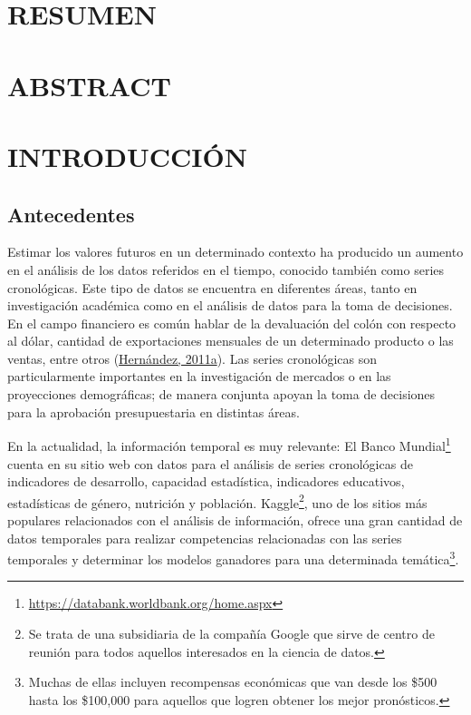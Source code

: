 \documentclass[
]{article}
\begin{document}
\cleardoublepage

\tableofcontents
\listoftables
\listoffigures

\cleardoublepage
{}

\newpage

\section*{RESUMEN}

\cleardoublepage

\section*{ABSTRACT}

\cleardoublepage

\section{INTRODUCCIÓN}

\subsection{Antecedentes}

Estimar los valores futuros en un determinado contexto ha producido un
aumento en el análisis de los datos referidos en el tiempo, conocido
también como series cronológicas. Este tipo de datos se encuentra en
diferentes áreas, tanto en investigación académica como en el análisis
de datos para la toma de decisiones. En el campo financiero es común
hablar de la devaluación del colón con respecto al dólar, cantidad de
exportaciones mensuales de un determinado producto o las ventas, entre
otros (\protect\hyperlink{ref-oscarh-1}{Hernández, 2011a}). Las series
cronológicas son particularmente importantes en la investigación de
mercados o en las proyecciones demográficas; de manera conjunta apoyan
la toma de decisiones para la aprobación presupuestaria en distintas
áreas.

En la actualidad, la información temporal es muy relevante: El Banco
Mundial\footnote{\url{https://databank.worldbank.org/home.aspx}} cuenta
en su sitio web con datos para el análisis de series cronológicas de
indicadores de desarrollo, capacidad estadística, indicadores
educativos, estadísticas de género, nutrición y población.
Kaggle\footnote{Se trata de una subsidiaria de la compañía Google que
  sirve de centro de reunión para todos aquellos interesados en la
  ciencia de datos.}, uno de los sitios más populares relacionados con
el análisis de información, ofrece una gran cantidad de datos temporales
para realizar competencias relacionadas con las series temporales y
determinar los modelos ganadores para una determinada
temática\footnote{Muchas de ellas incluyen recompensas económicas que
  van desde los \$500 hasta los \$100,000 para aquellos que logren
  obtener los mejor pronósticos.}.
\end{document}

